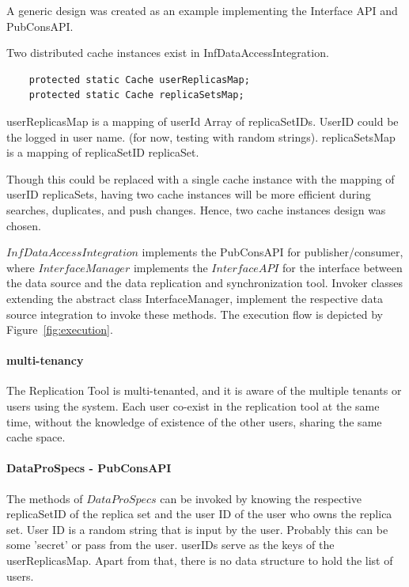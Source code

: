 \documentclass[conference]{IEEEtran}
\begin{document}
A generic design was created as an example implementing the Interface API and PubConsAPI.

Two distributed cache instances exist in InfDataAccessIntegration.
\begin{lstlisting}  
    protected static Cache userReplicasMap;
    protected static Cache replicaSetsMap;
\end{lstlisting}  
userReplicasMap is a mapping of userId  Array of replicaSetIDs. UserID could be the logged in user name. (for now, testing with random strings).
replicaSetsMap is a mapping of replicaSetID  replicaSet.

Though this could be replaced with a single cache instance with the mapping of userID  replicaSets, having two cache instances will be more efficient during searches, duplicates, and push changes. Hence, two cache instances design was chosen.

$InfDataAccessIntegration$ implements the PubConsAPI for publisher/consumer, where $InterfaceManager$ implements the $InterfaceAPI$ for the interface between the data source and the data replication and synchronization tool. Invoker classes extending the abstract class InterfaceManager, implement the respective data source integration to invoke these methods. The execution flow is depicted by Figure~\ref{fig:execution}.

\paragraph*{multi-tenancy}
The Replication Tool is multi-tenanted, and it is aware of the multiple tenants or users using the system. Each user co-exist in the replication tool at the same time, without the knowledge of existence of the other users, sharing the same cache space. 

\paragraph*{DataProSpecs - PubConsAPI}
The methods of $DataProSpecs$ can be invoked by knowing the respective replicaSetID of the replica set and the user ID of the user who owns the replica set. User ID is a random string that is input by the user. Probably this can be some 'secret' or pass from the user. userIDs serve as the keys of the userReplicasMap. Apart from that, there is no data structure to hold the list of users.
\end{document}
